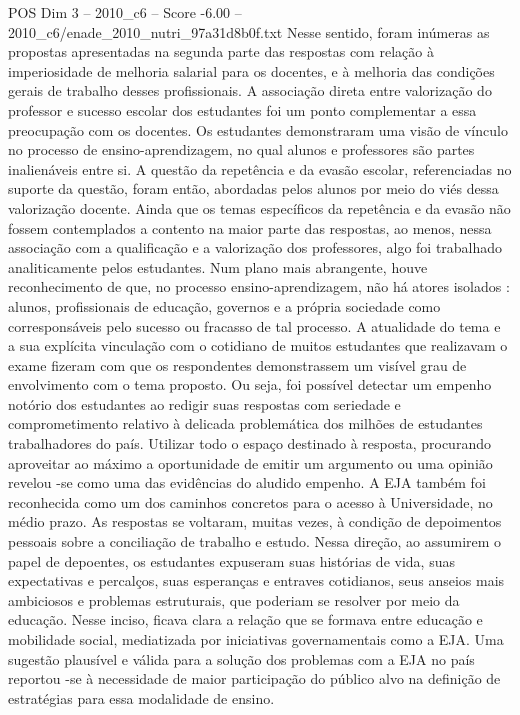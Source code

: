 \begin{textsample}{POS Dim 3 – 2010\_c6 – Score -6.00 – 2010\_c6/enade\_2010\_nutri\_97a31d8b0f.txt}
Nesse sentido, foram inúmeras as propostas apresentadas na segunda parte das respostas com relação à imperiosidade de melhoria salarial para os docentes, e à melhoria das condições gerais de trabalho desses profissionais.
A associação direta entre valorização do professor e sucesso escolar dos estudantes foi um ponto complementar a essa preocupação com os docentes.
Os estudantes demonstraram uma visão de vínculo no processo de ensino-aprendizagem, no qual alunos e professores são partes inalienáveis entre si.
A questão da repetência e da evasão escolar, referenciadas no suporte da questão, foram então, abordadas pelos alunos por meio do viés dessa valorização docente.
Ainda que os temas específicos da repetência e da evasão não fossem contemplados a contento na maior parte das respostas, ao menos, nessa associação com a qualificação e a valorização dos professores, algo foi trabalhado analiticamente pelos estudantes.
Num plano mais abrangente, houve reconhecimento de que, no processo ensino-aprendizagem, não há atores isolados : alunos, profissionais de educação, governos e a própria sociedade como corresponsáveis pelo sucesso ou fracasso de tal processo.
A atualidade do tema e a sua explícita vinculação com o cotidiano de muitos estudantes que realizavam o exame fizeram com que os respondentes demonstrassem um visível grau de envolvimento com o tema proposto.
Ou seja, foi possível detectar um empenho notório dos estudantes ao redigir suas respostas com seriedade e comprometimento relativo à delicada problemática dos milhões de estudantes trabalhadores do país.
Utilizar todo o espaço destinado à resposta, procurando aproveitar ao máximo a oportunidade de emitir um argumento ou uma opinião revelou -se como uma das evidências do aludido empenho.
A EJA também foi reconhecida como um dos caminhos concretos para o acesso à Universidade, no médio prazo.
As respostas se voltaram, muitas vezes, à condição de depoimentos pessoais sobre a conciliação de trabalho e estudo.
Nessa direção, ao assumirem o papel de depoentes, os estudantes expuseram suas histórias de vida, suas expectativas e percalços, suas esperanças e entraves cotidianos, seus anseios mais ambiciosos e problemas estruturais, que poderiam se resolver por meio da educação.
Nesse inciso, ficava clara a relação que se formava entre educação e mobilidade social, mediatizada por iniciativas governamentais como a EJA.
Uma sugestão plausível e válida para a solução dos problemas com a EJA no país reportou -se à necessidade de maior participação do público alvo na definição de estratégias para essa modalidade de ensino.

\end{textsample}
